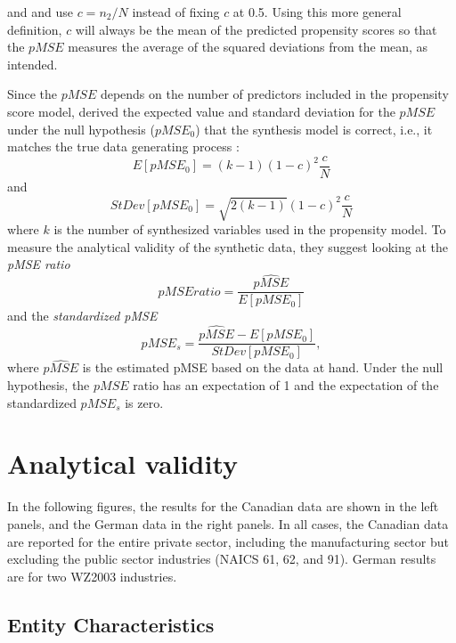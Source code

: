 \documentclass[10pt]{article}
\begin{document}
\citet{Woo_Reiter_Oganian_Karr_2009} and \citet{Snoke_RSSA2018} and use $c=n_2/N$ instead of fixing $c$ at 0.5. Using this more general definition, $c$ will always be the mean of the predicted propensity scores so that the $pMSE$ measures the average of the squared deviations from the mean, as intended. 

Since the $pMSE$ depends on the number of predictors included in the propensity score model, \textcite{Snoke_RSSA2018} derived the expected value and standard deviation for the $pMSE$ under the null hypothesis ($pMSE_0$) that the synthesis model is correct, i.e., it matches the true data generating process \parencite[Equation 1]{Snoke_RSSA2018}:
$$
E[pMSE_0] = (k-1)(1-c)^2 \frac{c}{N}
$$
and
$$
StDev[pMSE_0] = \sqrt{2(k-1)}(1-c)^2 \frac{c}{N}
$$
where $k$ is the number of synthesized variables used in the propensity model. To measure the analytical validity of the synthetic data, they suggest looking at the \textit{pMSE  ratio}
$$
pMSE ratio = \frac{\widehat{pMSE}}{E[pMSE_0]}
$$
and the \textit{standardized pMSE}
$$
pMSE_s =\frac{\widehat{pMSE}-E[pMSE_0]}{StDev[pMSE_0]},
$$
where $\widehat{pMSE}$ is the estimated pMSE based on the data at hand. Under the null hypothesis, the $pMSE$ ratio has an expectation of 1 and the expectation of the standardized $pMSE_s$ is zero.



\section{Analytical validity}
\label{sec:analytic}

\newcommand{\CanTableNote}{$LEAP$ is the Longitudinal Employment Analysis Program and $CanSynLBD$ is the Canadian synthetic database based on LEAP. }

In the following figures, the results for the Canadian data are shown in the left panels, and the German data in the right panels. In all cases, the Canadian data are reported for the entire private sector,  including the manufacturing sector but excluding  the public sector industries (NAICS 61, 62, and 91). German results are for two WZ2003 industries.

\subsection{Entity Characteristics}
\end{document}
